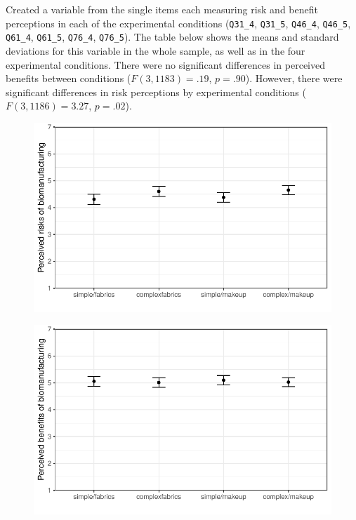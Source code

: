 \documentclass[
]{article}
\begin{document}
Created a variable from the single items each measuring risk and benefit
perceptions in each of the experimental conditions (\texttt{Q31\_4},
\texttt{Q31\_5}, \texttt{Q46\_4}, \texttt{Q46\_5}, \texttt{Q61\_4},
\texttt{Q61\_5}, \texttt{Q76\_4}, \texttt{Q76\_5}). The table below
shows the means and standard deviations for this variable in the whole
sample, as well as in the four experimental conditions. There were no
significant differences in perceived benefits between conditions
(\(F(3, 1183) = .19\), \(p = .90\)). However, there were significant
differences in risk perceptions by experimental conditions
(\(F(3,1186) = 3.27\), \(p = .02\)).

\begin{figure}

{\centering \includegraphics{BioMADE-fall2025-data-analysis_files/figure-pdf/risks-1.pdf}

}

\end{figure}

\begin{figure}

{\centering \includegraphics{BioMADE-fall2025-data-analysis_files/figure-pdf/benefits-1.pdf}

}

\end{figure}
\end{document}
